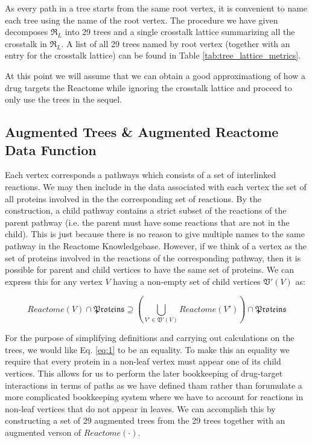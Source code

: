 \documentclass{article}
\begin{document}
\noindent As every path in a tree starts from the same root vertex, it is convenient to name each tree using the name of the root vertex. The procedure we have given decomposes $\mathfrak R_L$ into 29 trees and a single crosstalk lattice summarizing all the crosstalk in $\mathfrak R_L$. A list of all 29 trees named by root vertex (together with an entry for the crosstalk lattice) can be found in Table \ref{tab:tree_lattice_metrics}.

At this point we will assume that we can obtain a good approximationg of how a drug targets the Reactome while ignoring the crosstalk lattice and proceed to only use the trees in the sequel.

\subsection{Augmented Trees \& Augmented Reactome Data Function}

Each vertex corresponds a pathways which consists of a set of interlinked reactions. We may then include in the data associated with each vertex the set of all proteins involved in the the corresponding set of reactions. By the construction, a child pathway contains a strict subset of the reactions of the parent pathway (i.e. the parent must have some reactions that are not in the child). This is just because there is no reason to give multiple names to the same pathway in the Reactome Knowledgebase. However, if we think of a vertex as the set of proteins involved in the reactions of the corresponding pathway, then it is possible for parent and child vertices to have the same set of proteins. We can express this for any vertex $V$ having a non-empty set of child vertices $\mathfrak V'(V)$ as:

\begin{equation} \label{eq:1}
Reactome(V) \cap \mathfrak{Proteins} \supseteq \left(\bigcup_{V' \in \mathfrak{V}'(V)} Reactome(V')\right) \cap \mathfrak{Proteins}
\end{equation}

\noindent For the purpose of simplifying definitions and carrying out calculations on the trees, we would like Eq. \ref{eq:1} to be an equality. To make this an equality we require that every protein in a non-leaf vertex must appear one of its child vertices. This allows for us to perform the later bookkeeping of drug-target interactions in terms of paths as we have defined tham rather than forumulate a more complicated bookkeeping system where we have to account for reactions in non-leaf vertices that do not appear in leaves. We can accomplish this by constructing a set of 29 augmented trees from the 29 trees together with an augmented verson of $Reactome(\cdot)$.
\end{document}

